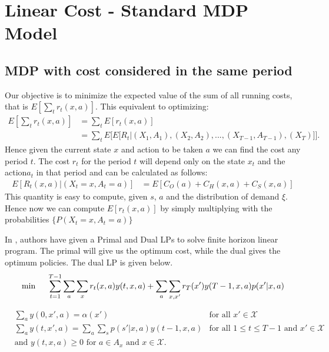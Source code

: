 \documentclass[11pt,a4paper,oneside]{report}
\begin{document}
\section{Linear Cost - Standard MDP Model}
\subsection{MDP with cost considered in the same period}
Our objective is to minimize the expected value of the sum of all running costs, that is $E[\sum_t r_t(x,a) ]$.
This equivalent to optimizing:
\begin{align}
E[\sum_t r_t(x,a) ]&=\sum_t E[r_t(x,a)] \\
&= \sum_t E \bigg[ E\Big[{R_t}|{(X_1,A_1),(X_2,A_2),...,(X_{T-1},A_{T-1}),(X_T)}\Big]\bigg].
\end{align}
\noindent Hence given the current state $x$ and action to be taken $a$ we can find the cost any period $t$. The  cost $r_t$ for the period $t$ will depend only on the state $x_t$ and the action$a_t$ in that period and can be calculated as follows:
\begin{align}
E[R_t(x,a)|{(X_t=x,A_t=a)}] &=  E[C_O(a) + C_H(x,a) + C_S(x,a)]
\end{align}
This quantity is easy to compute, given $s$, $a$ and the distribution of demand $\xi$.
Hence now we can compute $E[r_t(x,a)]$ by simply multiplying with the probabilities $\lbrace P( X_t=x, A_t=a)\rbrace$

In \citep{kumar2015finite}, authors have given a Primal and Dual LPs to solve finite horizon linear program. The primal will give us the optimum cost, while the dual gives the optimum policies. The dual LP is given below.\\

\begin{align}
\min \hspace{0.5cm} \sum_{t=1}^{T-1} \sum_{a} \sum_{x} r_t(x,a)y(t,x,a) + \sum_{a} \sum_{x,x'}r_T(x')y(T-1,x,a)p(x'|x,a)
\end{align}
\begin{flushleft}
\end{flushleft}
\begin{align*}
&\sum_a y(0,x',a)=\alpha(x')     &\text{for all } x'\in \mathcal{X} \\
&\sum_a y(t,x',a)=\sum_a \sum_s p(s'|x,a)y(t-1,x,a)    &\text{for all } 1\leq t\leq T-1 \text{ and } x'\in \mathcal{X}   \\ 
&\text{and } y(t,x,a)\geq 0 \text{ for } a\in A_x \text{ and } x\in \mathcal{X}. 
\end{align*}
\end{document}
